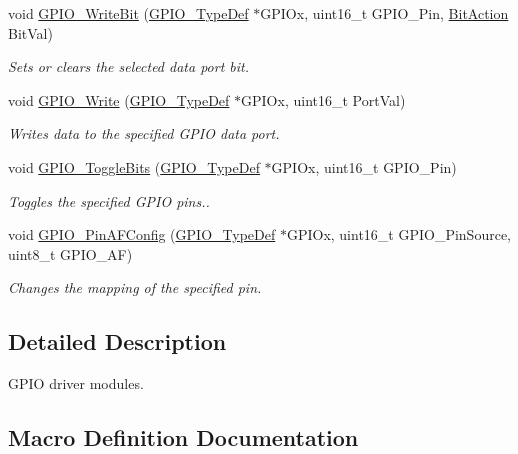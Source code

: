\begin{DoxyCompactItemize}
void \hyperlink{group___g_p_i_o_ga8f7b237fd744d9f7456fbe0da47a9b80}{G\+P\+I\+O\+\_\+\+Write\+Bit} (\hyperlink{struct_g_p_i_o___type_def}{G\+P\+I\+O\+\_\+\+Type\+Def} $\ast$G\+P\+I\+Ox, uint16\+\_\+t G\+P\+I\+O\+\_\+\+Pin, \hyperlink{group___g_p_i_o_ga176130b21c0e719121470a6042d4cf19}{Bit\+Action} Bit\+Val)
\begin{DoxyCompactList}\small\item\em Sets or clears the selected data port bit. \end{DoxyCompactList}\item 
void \hyperlink{group___g_p_i_o_gaa925f19c8547a00c7a0c269a84873bf9}{G\+P\+I\+O\+\_\+\+Write} (\hyperlink{struct_g_p_i_o___type_def}{G\+P\+I\+O\+\_\+\+Type\+Def} $\ast$G\+P\+I\+Ox, uint16\+\_\+t Port\+Val)
\begin{DoxyCompactList}\small\item\em Writes data to the specified G\+P\+IO data port. \end{DoxyCompactList}\item 
void \hyperlink{group___g_p_i_o_gac1b837c66258872740d5f89f23549ab1}{G\+P\+I\+O\+\_\+\+Toggle\+Bits} (\hyperlink{struct_g_p_i_o___type_def}{G\+P\+I\+O\+\_\+\+Type\+Def} $\ast$G\+P\+I\+Ox, uint16\+\_\+t G\+P\+I\+O\+\_\+\+Pin)
\begin{DoxyCompactList}\small\item\em Toggles the specified G\+P\+IO pins.. \end{DoxyCompactList}\item 
void \hyperlink{group___g_p_i_o_ga0a77617a322562ae84f8d72486032c5d}{G\+P\+I\+O\+\_\+\+Pin\+A\+F\+Config} (\hyperlink{struct_g_p_i_o___type_def}{G\+P\+I\+O\+\_\+\+Type\+Def} $\ast$G\+P\+I\+Ox, uint16\+\_\+t G\+P\+I\+O\+\_\+\+Pin\+Source, uint8\+\_\+t G\+P\+I\+O\+\_\+\+AF)
\begin{DoxyCompactList}\small\item\em Changes the mapping of the specified pin. \end{DoxyCompactList}\end{DoxyCompactItemize}


\subsection{Detailed Description}
G\+P\+IO driver modules. 



\subsection{Macro Definition Documentation}
